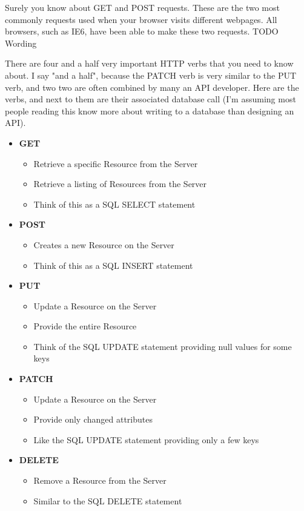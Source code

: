 \documentclass{book}
\begin{document}
Surely you know about GET and POST requests. These are the two most commonly requests used when your browser visits different webpages. All browsers, such as IE6, have been able to make these two requests. TODO Wording

There are four and a half very important HTTP verbs that you need to know about. I say "and a half", because the PATCH verb is very similar to the PUT verb, and two two are often combined by many an API developer. Here are the verbs, and next to them are their associated database call (I'm assuming most people reading this know more about writing to a database than designing an API).

\begin{itemize}
\item \textbf{GET}
    \begin{itemize}
    \item Retrieve a specific Resource from the Server
    \item Retrieve a listing of Resources from the Server
    \item Think of this as a SQL SELECT statement
    \end{itemize}
\item \textbf{POST}
    \begin{itemize}
    \item Creates a new Resource on the Server
    \item Think of this as a SQL INSERT statement
    \end{itemize}
\item \textbf{PUT}
    \begin{itemize}
    \item Update a Resource on the Server
    \item Provide the entire Resource
    \item Think of the SQL UPDATE statement providing null values for some keys
    \end{itemize}
\item \textbf{PATCH}
    \begin{itemize}
    \item Update a Resource on the Server
    \item Provide only changed attributes
    \item Like the SQL UPDATE statement providing only a few keys
    \end{itemize}
\item \textbf{DELETE}
    \begin{itemize}
    \item Remove a Resource from the Server
    \item Similar to the SQL DELETE statement
    \end{itemize}
\end{itemize}
\end{document}
